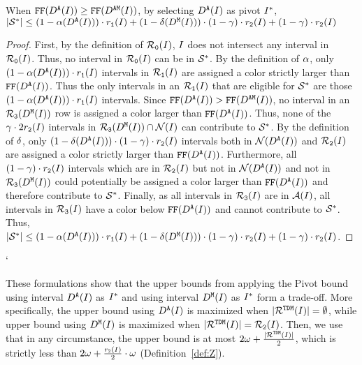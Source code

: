 {\begin{lemma}
    \label{lem:pivotset_y_exact_short}
    When $\text{\texttt{FF}}(D^\texttt{A}(I)) \geq \text{\texttt{FF}}(D^\texttt{AM}(I))$, by selecting $D^\texttt{A}(I)$ as pivot $I^*$, $|\mathcal{S}^*| \leq (1 - \alpha(D^\texttt{A}(I))) \cdot r_\texttt{1}(I) + (1 - \delta(D^\texttt{M}(I))) \cdot (1 - \gamma ) \cdot r_\texttt{2}(I) + (1 - \gamma ) \cdot r_\texttt{2}(I)$
\end{lemma}
\begin{proof}
    First, by the definition of $\mathcal{R}_\texttt{0}(I)$, $I$ does not intersect any interval in $\mathcal{R}_\texttt{0}(I)$.
    Thus, no interval in $\mathcal{R}_\texttt{0}(I)$ can be in $\mathcal{S}^*$.
    By the definition of $\alpha$, only $(1 - \alpha(D^\texttt{A}(I)) ) \cdot r_\texttt{1}(I)$ intervals in $\mathcal{R}_\texttt{1}(I)$ are assigned a color strictly larger than $\text{\texttt{FF}}(D^\texttt{A}(I))$.
    Thus the only intervals in an $\mathcal{R}_\texttt{1}(I)$ that are eligible for $\mathcal{S}^*$ are those $(1 - \alpha(D^\texttt{A}(I)) ) \cdot r_\texttt{1}(I)$ intervals.
    Since $\text{\texttt{FF}}(D^\texttt{A}(I)) > \text{\texttt{FF}}(D^\texttt{AM}(I))$, no interval in an $\mathcal{R}_\texttt{3}(D^\texttt{M}(I))$ row is assigned a color larger than $\text{\texttt{FF}}(D^\texttt{A}(I))$.
    Thus, none of the $\gamma \cdot 2r_\texttt{2}(I)$ intervals in $\mathcal{R}_\texttt{3}(D^\texttt{M}(I)) \cap \mathcal{N}(I)$ can contribute to $\mathcal{S}^*$.
    By the definition of $\delta$, only $(1 - \delta(D^\texttt{A}(I)) ) \cdot (1 - \gamma) \cdot r_\texttt{2}(I)$ intervals both in $\mathcal{N}(D^\texttt{A}(I))$ and $\mathcal{R}_\texttt{2}(I)$ are assigned a color strictly larger than $\text{\texttt{FF}}(D^\texttt{A}(I))$.
    Furthermore, all $(1 - \gamma) \cdot r_\texttt{2}(I)$ intervals which are in $\mathcal{R}_\texttt{2}(I)$ but not in $\mathcal{N}(D^\texttt{A}(I))$ and not in $\mathcal{R}_\texttt{3}(D^\texttt{M}(I))$ could potentially be assigned a color larger than $\text{\texttt{FF}}(D^\texttt{A}(I))$ and therefore contribute to $\mathcal{S}^*$.
    Finally, as all intervals in $\mathcal{R}_\texttt{3}(I)$ are in $\mathcal{A}(I)$, all intervals in $\mathcal{R}_\texttt{3}(I)$ have a color below $\text{\texttt{FF}}(D^\texttt{A}(I))$ and cannot contribute to $\mathcal{S}^*$.
    Thus, $|\mathcal{S}^*| \leq (1 - \alpha(D^\texttt{A}(I))) \cdot r_\texttt{1}(I) + (1 - \delta(D^\texttt{M}(I))) \cdot (1 - \gamma ) \cdot r_\texttt{2}(I) + (1 - \gamma ) \cdot r_\texttt{2}(I)$.
\end{proof}`}
These formulations show that the upper bounds from applying the Pivot bound using interval $D^\texttt{A}(I)$ as $I^*$ and using interval $D^\texttt{M}(I)$ as $I^*$ form a trade-off.
More specifically, the upper bound using $D^\texttt{A}(I)$ is maximized when $|\mathcal{R}^{\texttt{TDM}}(I)| = \emptyset$, while upper bound using $D^\texttt{M}(I)$ is maximized when $|\mathcal{R}^{\texttt{TDM}}(I)| = \mathcal{R}_\texttt{2}(I)$.
Then, we use that in any circumstance, the upper bound is at most $2\omega + \frac{|\mathcal{R}^{\texttt{TDM}}(I)|}{2}$, which is strictly less than $2\omega + \frac{r_\texttt{2}(I)}{2}\cdot\omega$ 
(Definition~\ref{def:Z}). 
